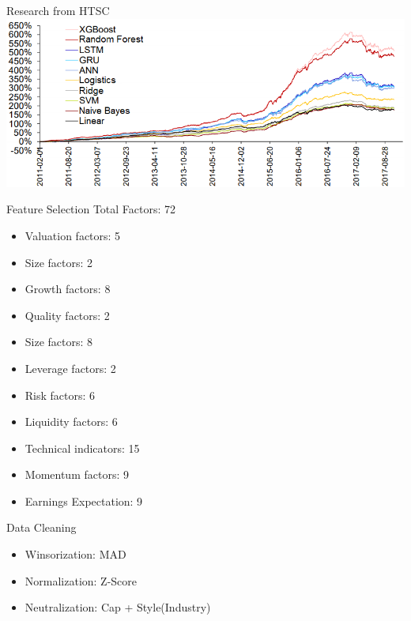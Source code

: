 \documentclass[aspectratio=169,11pt]{beamer}
\begin{document}
    \begin{frame}{Research from HTSC}
        \includegraphics[width=\linewidth]{ml_huatai.png}
    \end{frame}

    \begin{frame}{Feature Selection}
        Total Factors: 72
        \begin{itemize}
            \item Valuation factors: 5
            \item Size factors: 2
            \item Growth factors: 8
            \item Quality factors: 2
            \item Size factors: 8
            \item Leverage factors: 2
            \item Risk factors: 6
            \item Liquidity factors: 6
            \item Technical indicators: 15
            \item Momentum factors: 9
            \item Earnings Expectation: 9
        \end{itemize}
    \end{frame}

    \begin{frame}{Data Cleaning}
        \begin{itemize}
            \item Winsorization: MAD
            \item Normalization: Z-Score
            \item Neutralization: Cap + Style(Industry)
        \end{itemize}
    \end{frame}
\end{document}
